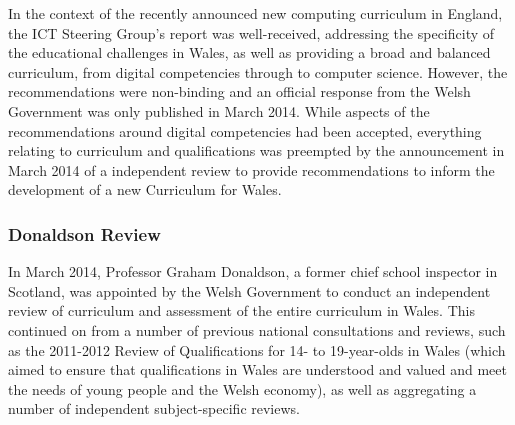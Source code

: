 \documentclass[conference]{IEEEtran}
\begin{document}

In the context of the recently announced new computing curriculum in
England, the ICT Steering Group's report was well-received, addressing
the specificity of the educational challenges in Wales, as well as
providing a broad and balanced curriculum, from digital competencies
through to computer science. However, the recommendations were
non-binding and an official response from the Welsh Government was
only published in March 2014. %
While aspects
of the recommendations around digital competencies had been accepted,
everything relating to curriculum and qualifications was preempted by
the announcement in March 2014 of a independent review to provide
recommendations to inform the development of a new Curriculum for
Wales. 


\subsubsection*{Donaldson Review}

In March 2014, Professor Graham Donaldson, a former chief school
inspector in Scotland, was appointed by the Welsh Government to
conduct an independent review of curriculum and assessment %
of the entire curriculum in Wales.  This continued on
from a number of previous national consultations and reviews, such as
the 2011-2012 Review of Qualifications %
for 14- to 19-year-olds in Wales (which aimed to ensure that qualifications
in Wales are understood and valued and meet the needs of young people and
the Welsh economy), as well as aggregating a number of independent
subject-specific reviews. %
\end{document}
